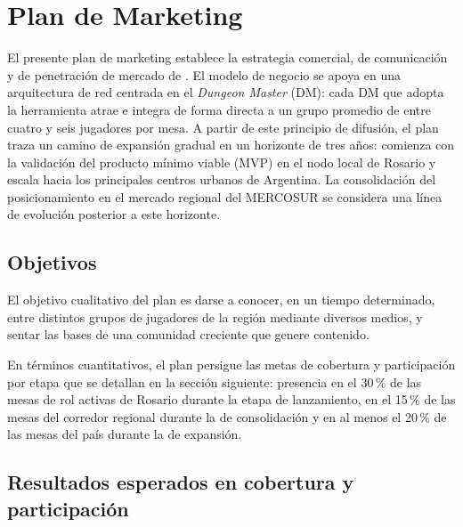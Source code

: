 \capredactadotrue
\section{Plan de Marketing}

El presente plan de marketing establece la estrategia comercial, de comunicación y de penetración de mercado de \nombreproyecto{}. El modelo de negocio se apoya en una arquitectura de red centrada en el \textit{Dungeon Master} (DM): cada DM que adopta la herramienta atrae e integra de forma directa a un grupo promedio de entre cuatro y seis jugadores por mesa. A partir de este principio de difusión, el plan traza un camino de expansión gradual en un horizonte de tres años: comienza con la validación del producto mínimo viable (MVP) en el nodo local de Rosario y escala hacia los principales centros urbanos de Argentina. La consolidación del posicionamiento en el mercado regional del MERCOSUR se considera una línea de evolución posterior a este horizonte.

\subsection{Objetivos}
El objetivo cualitativo del plan es darse a conocer, en un tiempo determinado, entre distintos grupos de jugadores de la región mediante diversos medios, y sentar las bases de una comunidad creciente que genere contenido.

En términos cuantitativos, el plan persigue las metas de cobertura y participación por etapa que se detallan en la sección siguiente: presencia en el 30\,\% de las mesas de rol activas de Rosario durante la etapa de lanzamiento, en el 15\,\% de las mesas del corredor regional durante la de consolidación y en al menos el 20\,\% de las mesas del país durante la de expansión.

\subsection{Resultados esperados en cobertura y participación}

